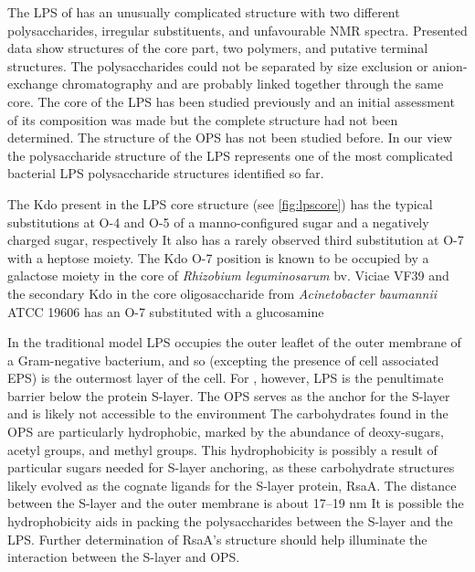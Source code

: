         The \ac{LPS} of \caulobacter has an unusually complicated structure with two different
        polysaccharides, irregular substituents, and unfavourable \ac{NMR} spectra. Presented data show
        structures of the core part, two polymers, and putative terminal structures. The polysaccharides
        could not be separated by size exclusion or anion-exchange chromatography and are probably linked
        together through the same core. The core of the \caulobacter{} \ac{LPS} has been studied previously
        and an initial assessment of its composition was made but the complete
        structure had not been determined. The structure of the \ac{OPS} has not been studied before. In our
        view the polysaccharide structure of the \caulobacter{} \ac{LPS} represents one of the most
        complicated bacterial \ac{LPS} polysaccharide structures identified so far.

        The Kdo present in the \ac{LPS} core structure (see \cref{fig:lpscore}) has the typical
        substitutions at O-4 and O-5 of a manno-configured sugar and a negatively charged sugar,
        respectively It also has a rarely observed third substitution at O-7 with a
        heptose moiety. The Kdo O-7 position is known to be occupied by a galactose moiety in the core of
        \textit{Rhizobium leguminosarum} bv. Viciae VF39 and the secondary Kdo in
        the core oligosaccharide from \textit{Acinetobacter baumannii} ATCC 19606 has an O-7 substituted
        with a glucosamine

        In the traditional model \ac{LPS} occupies the outer leaflet of the outer membrane of a
        Gram-negative bacterium, and so (excepting the presence of cell associated \ac{EPS}) is the
        outermost layer of the cell. For \caulobacter, however, \ac{LPS} is the penultimate barrier below
        the protein \ac{S-layer}. The \caulobacter{} \ac{OPS} serves as the anchor for the S-layer and is
        likely not accessible to the environment The carbohydrates found in the \ac{OPS}
        are particularly hydrophobic, marked by the abundance of deoxy-sugars, acetyl groups, and methyl
        groups. This hydrophobicity is possibly a result of particular sugars needed for \ac{S-layer}
        anchoring, as these carbohydrate structures likely evolved as the cognate ligands for the
        \ac{S-layer} protein, RsaA. The distance between the \ac{S-layer} and the outer membrane is about
        17--19 nm It is possible the hydrophobicity aids in packing the polysaccharides
        between the S-layer and the \ac{LPS}. Further determination of RsaA's structure should help
        illuminate the interaction between the S-layer and \ac{OPS}.

